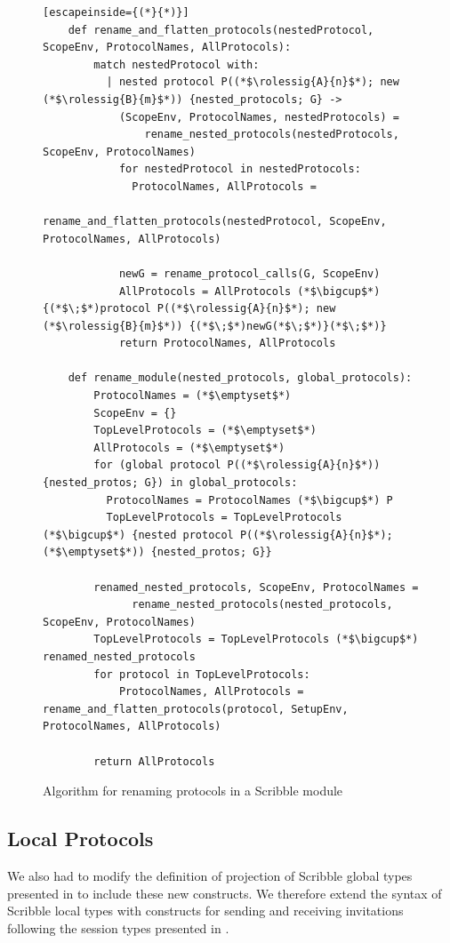 \documentclass[12pt,twoside]{report}
\begin{document}
\begin{figure}[h!]
    \centering
    \lstset{language=Pseudocode}
    \begin{lstlisting}[escapeinside={(*}{*)}]
    def rename_and_flatten_protocols(nestedProtocol, ScopeEnv, ProtocolNames, AllProtocols):
        match nestedProtocol with:
          | nested protocol P((*$\rolessig{A}{n}$*); new (*$\rolessig{B}{m}$*)) {nested_protocols; G} ->
            (ScopeEnv, ProtocolNames, nestedProtocols) = 
                rename_nested_protocols(nestedProtocols, ScopeEnv, ProtocolNames)
            for nestedProtocol in nestedProtocols:
              ProtocolNames, AllProtocols = 
                  rename_and_flatten_protocols(nestedProtocol, ScopeEnv, ProtocolNames, AllProtocols)

            newG = rename_protocol_calls(G, ScopeEnv)
            AllProtocols = AllProtocols (*$\bigcup$*) {(*$\;$*)protocol P((*$\rolessig{A}{n}$*); new (*$\rolessig{B}{m}$*)) {(*$\;$*)newG(*$\;$*)}(*$\;$*)}
            return ProtocolNames, AllProtocols
      
    def rename_module(nested_protocols, global_protocols):
        ProtocolNames = (*$\emptyset$*)
        ScopeEnv = {}
        TopLevelProtocols = (*$\emptyset$*)
        AllProtocols = (*$\emptyset$*)
        for (global protocol P((*$\rolessig{A}{n}$*)) {nested_protos; G}) in global_protocols:
          ProtocolNames = ProtocolNames (*$\bigcup$*) P
          TopLevelProtocols = TopLevelProtocols (*$\bigcup$*) {nested protocol P((*$\rolessig{A}{n}$*); (*$\emptyset$*)) {nested_protos; G}}

        renamed_nested_protocols, ScopeEnv, ProtocolNames = 
              rename_nested_protocols(nested_protocols, ScopeEnv, ProtocolNames)
        TopLevelProtocols = TopLevelProtocols (*$\bigcup$*) renamed_nested_protocols
        for protocol in TopLevelProtocols:
            ProtocolNames, AllProtocols = rename_and_flatten_protocols(protocol, SetupEnv, ProtocolNames, AllProtocols)

        return AllProtocols

    \end{lstlisting}
    \caption{Algorithm for renaming protocols in a Scribble module}
    \label{renaming-module}
\end{figure}
\clearpage
\subsection{Local Protocols}

We also had to modify the definition of projection of Scribble global types presented in \cite{featherweight} to include these new constructs. We therefore extend the syntax of Scribble local types with constructs for sending and receiving invitations following the session types presented in \cite{nestedprotocols}. 
\end{document}
